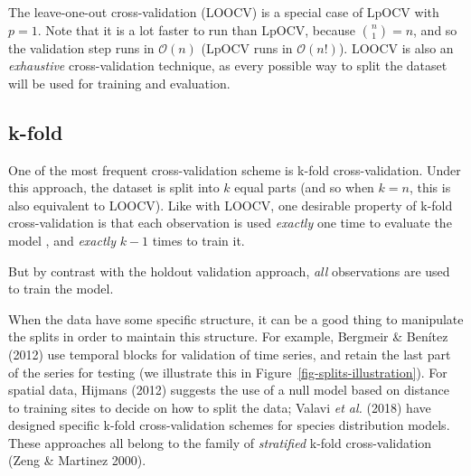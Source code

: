 \documentclass[
  letterpaper,
]{scrbook}
\begin{document}
The leave-one-out cross-validation (LOOCV) is a special case of LpOCV
with \(p=1\). Note that it is a lot faster to run than LpOCV, because
\(\binom{n}{1}=n\), and so the validation step runs in
\(\mathcal{O}(n)\) (LpOCV runs in \(\mathcal{O}(n!)\)). LOOCV is also an
\emph{exhaustive} cross-validation technique, as every possible way to
split the dataset will be used for training and evaluation.

\subsection{k-fold}\label{sec-crossvalidation-kfolds}

One of the most frequent cross-validation scheme is k-fold
cross-validation. Under this approach, the dataset is split into \(k\)
equal parts (and so when \(k = n\), this is also equivalent to LOOCV).
Like with LOOCV, one desirable property of k-fold cross-validation is
that each observation is used \emph{exactly} one time to evaluate the
model , and \emph{exactly} \(k-1\) times to train it.

But by contrast with the holdout validation approach, \emph{all}
observations are used to train the model.

When the data have some specific structure, it can be a good thing to
manipulate the splits in order to maintain this structure. For example,
Bergmeir \& Benítez (2012) use temporal blocks for validation of time
series, and retain the last part of the series for testing (we
illustrate this in Figure~\ref{fig-splits-illustration}). For spatial
data, Hijmans (2012) suggests the use of a null model based on distance
to training sites to decide on how to split the data; Valavi \emph{et
al.} (2018) have designed specific k-fold cross-validation schemes for
species distribution models. These approaches all belong to the family
of \emph{stratified} k-fold cross-validation (Zeng \& Martinez 2000).
\end{document}
